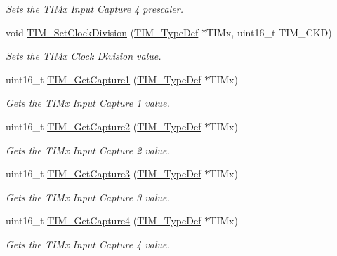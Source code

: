 \begin{DoxyCompactItemize}
\begin{DoxyCompactList}\small\item\em Sets the T\+I\+Mx Input Capture 4 prescaler. \end{DoxyCompactList}\item 
void \mbox{\hyperlink{group___t_i_m___private___functions_ga20ef804dc32c723662d11ee7da3baab2}{T\+I\+M\+\_\+\+Set\+Clock\+Division}} (\mbox{\hyperlink{struct_t_i_m___type_def}{T\+I\+M\+\_\+\+Type\+Def}} $\ast$T\+I\+Mx, uint16\+\_\+t T\+I\+M\+\_\+\+C\+KD)
\begin{DoxyCompactList}\small\item\em Sets the T\+I\+Mx Clock Division value. \end{DoxyCompactList}\item 
uint16\+\_\+t \mbox{\hyperlink{group___t_i_m___private___functions_ga29eb9f7151ceea94c3988539a5ee91cf}{T\+I\+M\+\_\+\+Get\+Capture1}} (\mbox{\hyperlink{struct_t_i_m___type_def}{T\+I\+M\+\_\+\+Type\+Def}} $\ast$T\+I\+Mx)
\begin{DoxyCompactList}\small\item\em Gets the T\+I\+Mx Input Capture 1 value. \end{DoxyCompactList}\item 
uint16\+\_\+t \mbox{\hyperlink{group___t_i_m___private___functions_ga437fcf00ee9d0a9df9150cc120efc5ad}{T\+I\+M\+\_\+\+Get\+Capture2}} (\mbox{\hyperlink{struct_t_i_m___type_def}{T\+I\+M\+\_\+\+Type\+Def}} $\ast$T\+I\+Mx)
\begin{DoxyCompactList}\small\item\em Gets the T\+I\+Mx Input Capture 2 value. \end{DoxyCompactList}\item 
uint16\+\_\+t \mbox{\hyperlink{group___t_i_m___private___functions_gab71d1d3d8a15f3be9e74dca51fcca5fa}{T\+I\+M\+\_\+\+Get\+Capture3}} (\mbox{\hyperlink{struct_t_i_m___type_def}{T\+I\+M\+\_\+\+Type\+Def}} $\ast$T\+I\+Mx)
\begin{DoxyCompactList}\small\item\em Gets the T\+I\+Mx Input Capture 3 value. \end{DoxyCompactList}\item 
uint16\+\_\+t \mbox{\hyperlink{group___t_i_m___private___functions_ga09049af04c8345849c6f82ccfae242a6}{T\+I\+M\+\_\+\+Get\+Capture4}} (\mbox{\hyperlink{struct_t_i_m___type_def}{T\+I\+M\+\_\+\+Type\+Def}} $\ast$T\+I\+Mx)
\begin{DoxyCompactList}\small\item\em Gets the T\+I\+Mx Input Capture 4 value. \end{DoxyCompactList}\item 

\end{DoxyCompactItemize}
